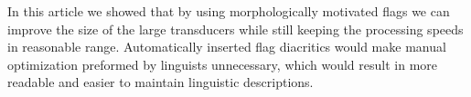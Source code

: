 \documentclass[11pt]{article}
\begin{document}
In this article we showed that by using morphologically motivated
flags we can improve the size of the large transducers while still
keeping the processing speeds in reasonable range.  Automatically
inserted flag diacritics would make manual optimization preformed by
linguists unnecessary, which would result in more readable and easier
to maintain linguistic descriptions.  



\end{document}
